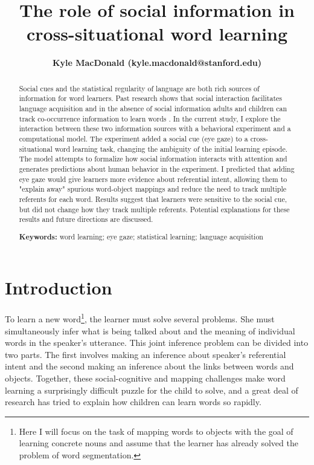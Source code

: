 \documentclass[10pt,letterpaper]{article}
\title{The role of social information in cross-situational word learning}
\author{{\large \bf Kyle MacDonald (kyle.macdonald@stanford.edu)}}
\begin{document}
\maketitle


\begin{abstract}
Social cues and the statistical regularity of language are both rich sources of information for word learners. Past research shows that social interaction facilitates language acquisition \cite{baldwin1995understanding, brooks2008infant} and in the absence of social information adults and children can track co-occurrence information to learn words \cite{blythe2010learning,smith2008infants}.  In the current study, I explore the interaction between these two information sources with a behavioral experiment and a computational model. The experiment added a social cue (eye gaze) to a cross-situational word learning task, changing the ambiguity of the initial learning episode. The model attempts to formalize how social information interacts with attention and generates predictions about human behavior in the experiment. I predicted that adding eye gaze would give learners more evidence about referential intent, allowing them to "explain away" spurious word-object mappings and reduce the need to track multiple referents for each word. Results suggest that learners were sensitive to the social cue, but did not change how they track multiple referents. Potential explanations for these results and future directions are discussed.  

\textbf{Keywords:} 
word learning; eye gaze; statistical learning; language acquisition
\end{abstract}


\section{Introduction}
To learn a new word\footnote{Here I will focus on the task of mapping words to objects with the goal of learning concrete nouns and assume that the learner has already solved the problem of word segmentation.}, the learner must solve several problems. She must simultaneously infer what is being talked about and the meaning of individual words in the speaker's utterance. This joint inference problem can be divided into two parts. The first involves making an inference about speaker's referential intent and the second making an inference about the links between words and objects. Together, these social-cognitive and mapping challenges make word learning a surprisingly difficult puzzle for the child to solve, and a great deal of research has tried to explain how children can learn words so rapidly.
\end{document}
